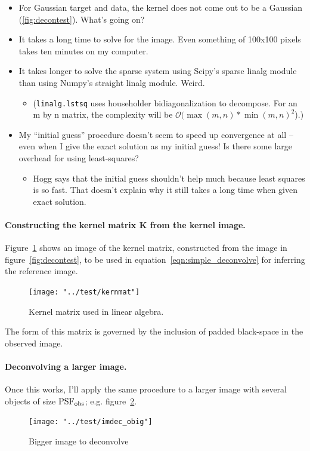 \documentclass[letterpaper, 11pt]{article}
\def\psfobs{\ensuremath{{\rm PSF_{obs}}}\xspace}
\begin{document}
\begin{itemize}	
	\item For Gaussian target and data, the kernel does not come out to be a Gaussian (\ref{fig:decontest}). What's going on?
	\item It takes a long time to solve for the image. Even something of 100x100 pixels takes ten minutes on my computer.
	\item It takes longer to solve the sparse system using Scipy's sparse linalg module than using Numpy's straight linalg module. Weird.
	\begin{itemize}
		\item (\texttt{linalg.lstsq} uses householder bidiagonalization to decompose. For an m by n matrix, the complexity will be $\mathcal{O}(\max(m, n) * \min(m, n)^2$).)
	\end{itemize}	
	\item My ``initial guess'' procedure doesn't seem to speed up convergence at all -- even when I give the exact solution as my initial guess! Is there some large overhead for using least-squares?
	\begin{itemize}
		\item Hogg says that the initial guess shouldn't help much because least squares is so fast. That doesn't explain why it still takes a long time when given exact solution.
	\end{itemize}	
\end{itemize}



\paragraph{Constructing the kernel matrix $\mathbf K$ from the kernel image.} Figure~\ref{fig:kernmat} shows an image of the kernel matrix, constructed from the image in figure~\ref{fig:decontest}, to be used in equation~\ref{eqn:simple_deconvolve} for inferring the reference image.
\begin{figure}[h]
	\centering
	\texttt{[image: "../test/kernmat"]}
	\caption{Kernel matrix used in linear algebra.}
	\label{fig:kernmat}
\end{figure}

The form of this matrix is governed by the inclusion of padded black-space in the observed image.

\paragraph{Deconvolving a larger image.} Once this works, I'll apply the same procedure to a larger image with several objects of size \psfobs; e.g. figure~\ref{fig:tiled}.
\begin{figure}
	\centering
	\texttt{[image: "../test/imdec\_obig"]}
	\caption{Bigger image to deconvolve}
	\label{fig:tiled}
\end{figure}
\end{document}
